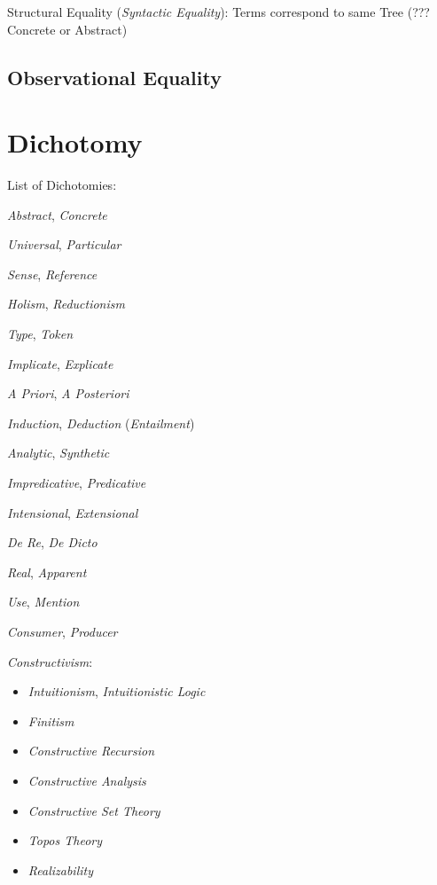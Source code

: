 Structural Equality (\emph{Syntactic Equality}): Terms correspond to
same Tree (??? Concrete or Abstract)



\subsection{Observational Equality}\label{sec:observational_equality}



\section{Dichotomy}\label{sec:dichotomy}

List of Dichotomies:

\emph{Abstract}, \emph{Concrete}

\emph{Universal}, \emph{Particular}

\emph{Sense}, \emph{Reference}

\emph{Holism}, \emph{Reductionism}

\emph{Type}, \emph{Token}

\emph{Implicate}, \emph{Explicate}

\emph{A Priori}, \emph{A Posteriori}

\emph{Induction}, \emph{Deduction} (\emph{Entailment})

\emph{Analytic}, \emph{Synthetic}

\emph{Impredicative}, \emph{Predicative}

\emph{Intensional}, \emph{Extensional}

\emph{De Re}, \emph{De Dicto}

\emph{Real}, \emph{Apparent}

\emph{Use}, \emph{Mention}

\emph{Consumer}, \emph{Producer}

\emph{Constructivism}:
\begin{itemize}
    \item \emph{Intuitionism}, \emph{Intuitionistic Logic}
    \item \emph{Finitism}
    \item \emph{Constructive Recursion}
    \item \emph{Constructive Analysis}
    \item \emph{Constructive Set Theory}
    \item \emph{Topos Theory}
    \item \emph{Realizability}
\end{itemize}

